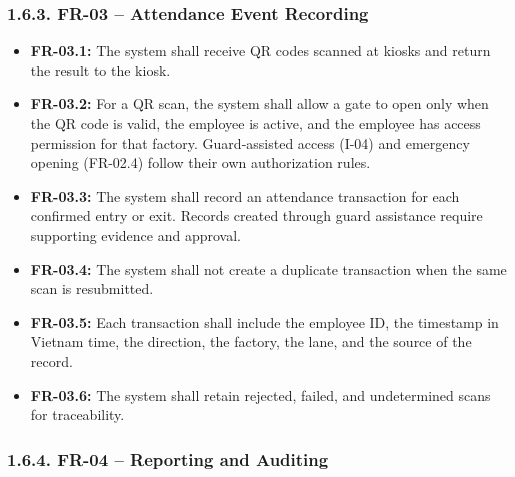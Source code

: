 \subsubsection*{1.6.3. FR-03 -- Attendance Event Recording}

{}

\begin{itemize}[leftmargin=36pt, itemsep=2pt, topsep=4pt, parsep=2pt]
  \item \textbf{FR-03.1:} The system shall receive QR codes scanned at kiosks and return the result to the kiosk.
  \item \textbf{FR-03.2:} For a QR scan, the system shall allow a gate to open only when the QR code is valid, the employee is active, and the employee has access permission for that factory. Guard-assisted access (I-04) and emergency opening (FR-02.4) follow their own authorization rules.
  \item \textbf{FR-03.3:} The system shall record an attendance transaction for each confirmed entry or exit. Records created through guard assistance require supporting evidence and approval.
  \item \textbf{FR-03.4:} The system shall not create a duplicate transaction when the same scan is resubmitted.
  \item \textbf{FR-03.5:} Each transaction shall include the employee ID, the timestamp in Vietnam time, the direction, the factory, the lane, and the source of the record.
  \item \textbf{FR-03.6:} The system shall retain rejected, failed, and undetermined scans for traceability.
\end{itemize}

\subsubsection*{1.6.4. FR-04 -- Reporting and Auditing}

{}


